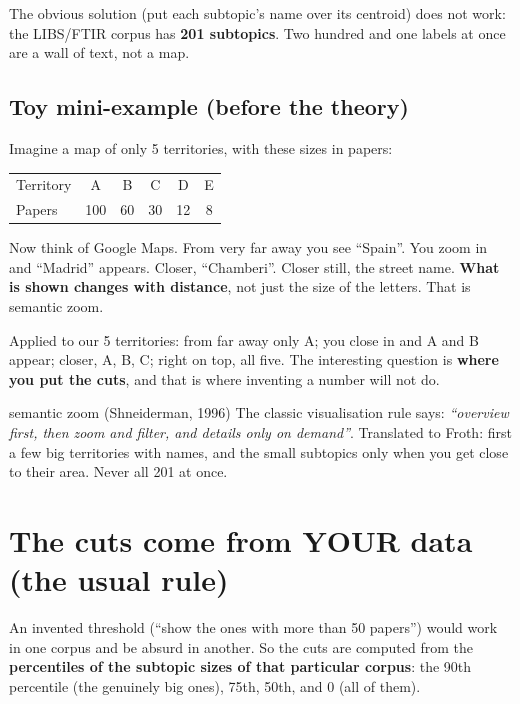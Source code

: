 \documentclass[11pt,a4paper]{article}
\begin{document}
The obvious solution (put each subtopic's name over its centroid) does not work: the LIBS/FTIR
corpus has \textbf{201 subtopics}. Two hundred and one labels at once are a wall of text, not a
map.

\subsection{Toy mini-example (before the theory)}

Imagine a map of only 5 territories, with these sizes in papers:

\begin{center}
\begin{tabular}{lccccc}
\hline
Territory & A & B & C & D & E \\
Papers    & 100 & 60 & 30 & 12 & 8 \\
\hline
\end{tabular}
\end{center}

Now think of Google Maps. From very far away you see ``Spain''. You zoom in and ``Madrid''
appears. Closer, ``Chamberi''. Closer still, the street name. \textbf{What is shown changes with
distance}, not just the size of the letters. That is semantic zoom.

Applied to our 5 territories: from far away only A; you close in and A and B appear; closer, A,
B, C; right on top, all five. The interesting question is \textbf{where you put the cuts}, and
that is where inventing a number will not do.

\begin{concepto}{semantic zoom (Shneiderman, 1996)}
The classic visualisation rule says: \emph{``overview first, then zoom and filter, and details
only on demand''}. Translated to Froth: first a few big territories with names, and the small
subtopics only when you get close to their area. Never all 201 at once.
\end{concepto}

\section{The cuts come from YOUR data (the usual rule)}

An invented threshold (``show the ones with more than 50 papers'') would work in one corpus and
be absurd in another. So the cuts are computed from the \textbf{percentiles of the subtopic
sizes of that particular corpus}: the 90th percentile (the genuinely big ones), 75th, 50th, and
0 (all of them).
\end{document}
